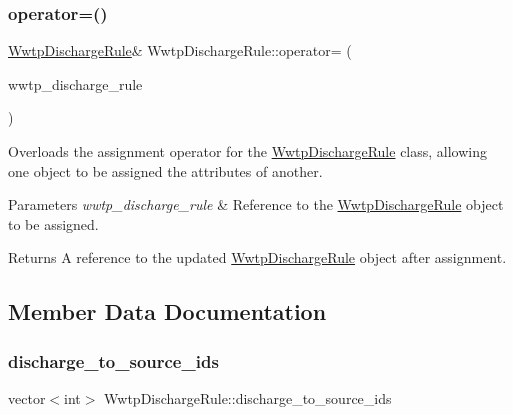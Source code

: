\subsubsection{\texorpdfstring{operator=()}{operator=()}}
{\footnotesize\ttfamily \mbox{\hyperlink{classWwtpDischargeRule}{Wwtp\+Discharge\+Rule}}\& Wwtp\+Discharge\+Rule\+::operator= (\begin{DoxyParamCaption}\item[{const \mbox{\hyperlink{classWwtpDischargeRule}{Wwtp\+Discharge\+Rule}} \&}]{wwtp\+\_\+discharge\+\_\+rule }\end{DoxyParamCaption})}



Overloads the assignment operator for the {\ttfamily \mbox{\hyperlink{classWwtpDischargeRule}{Wwtp\+Discharge\+Rule}}} class, allowing one object to be assigned the attributes of another. 


\begin{DoxyParams}{Parameters}
{\em wwtp\+\_\+discharge\+\_\+rule} & Reference to the {\ttfamily \mbox{\hyperlink{classWwtpDischargeRule}{Wwtp\+Discharge\+Rule}}} object to be assigned.\\
\hline
\end{DoxyParams}
\begin{DoxyReturn}{Returns}
A reference to the updated {\ttfamily \mbox{\hyperlink{classWwtpDischargeRule}{Wwtp\+Discharge\+Rule}}} object after assignment. 
\end{DoxyReturn}


\subsection{Member Data Documentation}
\mbox{\label{classWwtpDischargeRule_ac2f77a9fca93eef3fd26ff1d579130be}} 
\subsubsection{\texorpdfstring{discharge\+\_\+to\+\_\+source\+\_\+ids}{discharge\_to\_source\_ids}}
{\footnotesize\ttfamily vector$<$int$>$ Wwtp\+Discharge\+Rule\+::discharge\+\_\+to\+\_\+source\+\_\+ids}



